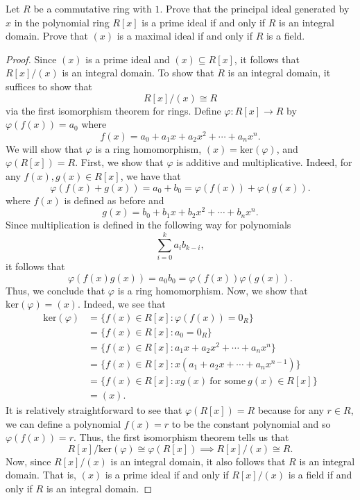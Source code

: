 \documentclass[a4paper]{article}
\begin{document}
\begin{problem}
    Let \( R   \) be a commutative ring with \( 1  \). Prove that the principal ideal generated by \( x  \) in the polynomial ring \( R[x] \) is a prime ideal if and only if \( R  \) is an integral domain. Prove that \( (x) \) is a maximal ideal if and only if \( R  \) is a field.
\end{problem}
\begin{proof}
    Since \( (x)  \) is a prime ideal and \( (x) \subseteq R[x]  \), it follows that \( R[x] / (x) \) is an integral domain. To show that \( R  \) is an integral domain, it suffices to show that  
    \[  R[x] / (x) \cong R  \]
    via the first isomorphism theorem for rings. Define \( \varphi: R[x] \to R  \) by \( \varphi(f(x)) = {a}_{0} \) where 
    \[  f(x) = {a}_{0} + {a}_{1} x + {a}_{2}x^{2} + \cdots + {a}_{n} x^{n}. \]
    We will show that \( \varphi  \) is a ring homomorphism, \( (x) = \text{ker}(\varphi)  \), and \( \varphi(R[x]) = R  \). First, we show that \( \varphi  \) is additive and multiplicative. Indeed, for any \( f(x), g(x) \in R[x] \), we have that   
    \[ \varphi(f(x) + g(x)) = {a}_{0} + {b}_{0} = \varphi(f(x))  +\varphi(g(x)).  \]
    where \( f(x) \) is defined as before and 
    \[  g(x) = {b}_{0} + {b}_{1}x + {b}_{2}x^{2} + \cdots  + {b}_{n}x^{n}. \]
    Since multiplication is defined in the following way for polynomials 
    \[  \sum_{ i = 0  }^{  k } {a}_{i} {b}_{k-i}, \]
    it follows that 
    \[  \varphi(f(x)g(x)) = {a}_{0}{b}_{0} = \varphi(f(x)) \varphi(g(x)). \]
    Thus, we conclude that \( \varphi  \) is a ring homomorphism. Now, we show that \( \text{ker}(\varphi) = (x) \). Indeed, we see that 
    \begin{align*}
        \text{ker}(\varphi)  &= \{ f(x) \in R[x] : \varphi(f(x)) = {0}_{R} \}  \\
                             &= \{ f(x) \in R[x] : {a}_{0} = {0}_{R} \}  \\
                             &= \{ f(x) \in R[x] : {a}_{1}x + {a}_{2} x^{2} + \cdots + {a}_{n} x^{n} \}  \\
                             &= \{ f(x) \in R[x] : x ({a}_{1} + {a}_{2} x + \cdots + {a}_{n} x^{n-1}) \} \\
                             &= \{ f(x) \in R[x] : x g(x) \ \text{for some} \ g(x) \in R[x]  \} \\ 
                             &= (x).
    \end{align*}
    It is relatively straightforward to see that \( \varphi(R[x]) = R  \) because for any \( r \in R  \), we can define a polynomial \( f(x)  = r  \) to be the constant polynomial and so \( \varphi(f(x)) = r  \). Thus, the first isomorphism theorem tells us that 
    \[  R[x] / \text{ker}(\varphi)  \cong \varphi(R[x]) \implies R[x] / (x) \cong R.   \]
    Now, since \( R[x]/ (x) \) is an integral domain, it also follows that \( R  \) is an integral domain. That is, \( (x) \) is a prime ideal if and only if \( R[x] / (x) \) is a field if and only if \( R  \) is an integral domain.
\end{proof}
\end{document}

